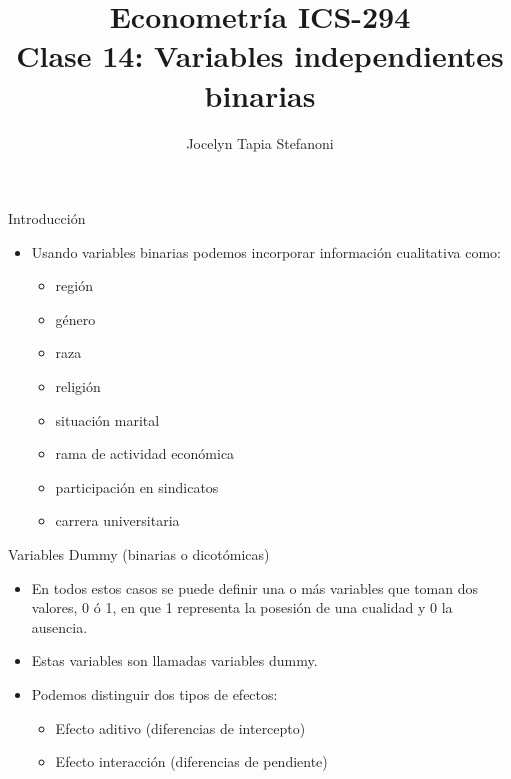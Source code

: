 \documentclass{beamer}
\title[ICS-162]{Econometría ICS-294\\ \small{Clase 14: Variables independientes binarias }}
\author{Jocelyn Tapia Stefanoni}
\institute[USM]
{Universidad Técnica Federico Santa María\\ %
	\medskip
	\textit{} %
	
}
\date{}
\begin{document}
	
\begin{frame}
	\titlepage %


\end{frame}
\logo{}

\begin{frame}{Introducción}
    \begin{itemize}
        
        \item Usando variables binarias podemos incorporar información cualitativa como:
        \begin{itemize}
            \item región
            \item género
            \item raza
            \item religión
            \item situación marital
            \item rama de actividad económica
            \item participación en sindicatos
            \item carrera universitaria
        \end{itemize}
        
    \end{itemize}
\end{frame}
\begin{frame}{Variables Dummy (binarias o dicotómicas)}
    \begin{itemize}
        \item En todos estos casos se puede definir una o más variables que toman dos valores, 0 ó 1, en que 1 representa la posesión de una cualidad y 0 la ausencia.
        \item Estas variables son llamadas variables dummy.
        \item Podemos distinguir dos tipos de efectos:
        \begin{itemize}
            \item Efecto aditivo (diferencias de intercepto)
            \item Efecto interacción (diferencias de pendiente)
        \end{itemize}
    \end{itemize}
\end{frame}
\end{document}
